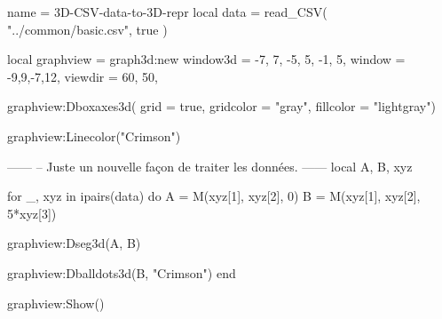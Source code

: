 \documentclass{standalone}
\begin{document}
\begin{luadraw}{name = 3D-CSV-data-to-3D-repr}
local data = read_CSV(
  "../common/basic.csv",
  true
)

local graphview = graph3d:new{
  window3d = {-7, 7, -5, 5, -1, 5},
  window   = {-9,9,-7,12},
  viewdir  = {60, 50},
}

graphview:Dboxaxes3d({
  grid      = true,
  gridcolor = "gray",
  fillcolor = "lightgray"})

graphview:Linecolor("Crimson")

------
-- Juste un nouvelle façon de traiter les données.
------
local A, B, xyz

for _, xyz in ipairs(data) do
  A = M(xyz[1], xyz[2], 0)
  B = M(xyz[1], xyz[2], 5*xyz[3])

  graphview:Dseg3d({A, B})

  graphview:Dballdots3d({B}, "Crimson")
end

graphview:Show()
\end{luadraw}
\end{document}
